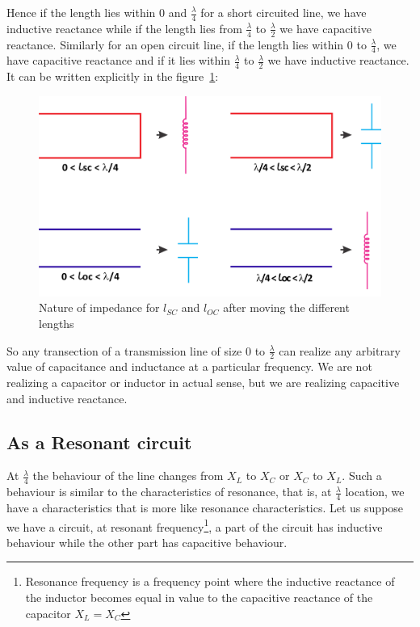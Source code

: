 Hence if the length lies within 0 and $ \frac{\lambda}{4} $ for a short circuited line, we have inductive reactance while if the length lies from $ \frac{\lambda}{4} $ to $ \frac{\lambda}{2} $ we have capacitive reactance. Similarly for an open circuit line, if  the length lies within 0 to $ \frac{\lambda}{4} $, we have capacitive reactance and if it lies within $ \frac{\lambda}{4} $ to $ \frac{\lambda}{2} $ we have inductive reactance. It can be written explicitly in the figure~\ref{fig:group10diagram10}:
\begin{figure}[h]
\centering
\includegraphics[width=1\linewidth]{./graphics/group10diagram9}
\caption{Nature of impedance for $ l_{SC} $ and $ l_{OC} $ after moving the different lengths}
\label{fig:group10diagram10}
\end{figure}

So any transection of a transmission line of size 0 to $ \frac{\lambda}{2} $ can realize any arbitrary value of capacitance and inductance at a particular frequency. We are not realizing a capacitor or inductor in actual sense, but we are realizing capacitive and inductive reactance.

\subsection{As a Resonant circuit}
At $ \frac{\lambda}{4} $ the behaviour of the line changes from $ X_{L} $ to $ X_{C} $ or $ X_{C} $ to $ X_{L} $. Such a behaviour is similar to the characteristics of resonance, that is, at $\frac{\lambda}{4}$  location, we have a characteristics that is more like resonance characteristics. Let us suppose we have a circuit, at resonant frequency\footnote{
Resonance frequency is a frequency point where the inductive reactance of the inductor becomes equal in value to the capacitive reactance of the capacitor $ X_{L} = X_{C} $
}, a part of the circuit has inductive behaviour while the other part has capacitive behaviour. 

